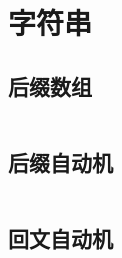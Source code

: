 \chapter{字符串}
\section{后缀数组}
\inputminted{cpp}{\source/string/suffix-array.cpp}
\section{后缀自动机}
\inputminted{cpp}{\source/string/suffix-automaton.cpp}
\section{回文自动机}
\inputminted{cpp}{\source/string/palindromic-tree.cpp}
